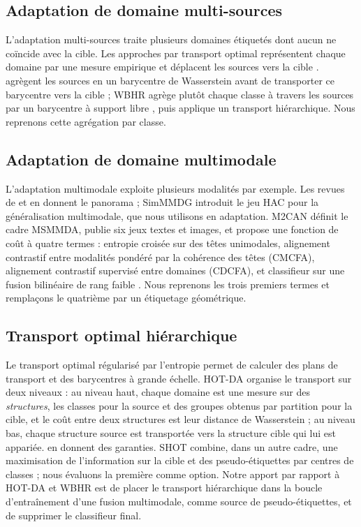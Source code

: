 \documentclass[11pt,a4paper]{article}
\theoremstyle{definition}
\theoremstyle{remark}
\begin{document}
\subsection{Adaptation de domaine multi-sources}
L'adaptation multi-sources traite plusieurs domaines étiquetés dont aucun ne coïncide avec la cible. Les approches par
transport optimal représentent chaque domaine par une mesure empirique et déplacent les sources vers la cible
\citep{courty2017otda}. \citet{montesuma2021wbtransport} agrègent les sources en un barycentre de Wasserstein avant de
transporter ce barycentre vers la cible ; WBHR \citep{elhamri2025wbhr} agrège plutôt chaque classe à travers les
sources par un barycentre à support libre \citep{cuturi2014fast}, puis applique un transport hiérarchique. Nous
reprenons cette agrégation par classe.

\subsection{Adaptation de domaine multimodale}
L'adaptation multimodale exploite plusieurs modalités par exemple. Les revues de \citet{dong2026mmadaptsurvey} et
\citet{li2025mmalignsurvey} en donnent le panorama ; SimMMDG \citep{dong2023simmmdg} introduit le jeu HAC pour la
généralisation multimodale, que nous utilisons en adaptation. M2CAN \citep{zhao2025msmmda} définit le cadre MSMMDA,
publie six jeux textes et images, et propose une fonction de coût à quatre termes : entropie croisée sur des têtes
unimodales, alignement contrastif entre modalités pondéré par la cohérence des têtes (CMCFA), alignement contrastif
supervisé entre domaines (CDCFA), et classifieur sur une fusion bilinéaire de rang faible \citep{kim2017mlb}. Nous
reprenons les trois premiers termes et remplaçons le quatrième par un étiquetage géométrique.

\subsection{Transport optimal hiérarchique}
Le transport optimal régularisé par l'entropie \citep{cuturi2013sinkhorn, peyre2019computationalot} permet de calculer
des plans de transport et des barycentres \citep{cuturi2014fast} à grande échelle. HOT-DA \citep{elhamri2022hotda}
organise le transport sur deux niveaux : au niveau haut, chaque domaine est une mesure sur des \emph{structures}, les
classes pour la source et des groupes obtenus par partition pour la cible, et le coût entre deux structures est leur
distance de Wasserstein ; au niveau bas, chaque structure source est transportée vers la structure cible qui lui est
appariée. \citet{elhamri2025theoretical} en donnent des garanties. SHOT \citep{liang2020shot} combine, dans un autre
cadre, une maximisation de l'information sur la cible et des pseudo-étiquettes par centres de classes ; nous évaluons la
première comme option. Notre apport par rapport à HOT-DA et WBHR est de placer le transport hiérarchique dans la boucle
d'entraînement d'une fusion multimodale, comme source de pseudo-étiquettes, et de supprimer le classifieur final.
\end{document}
